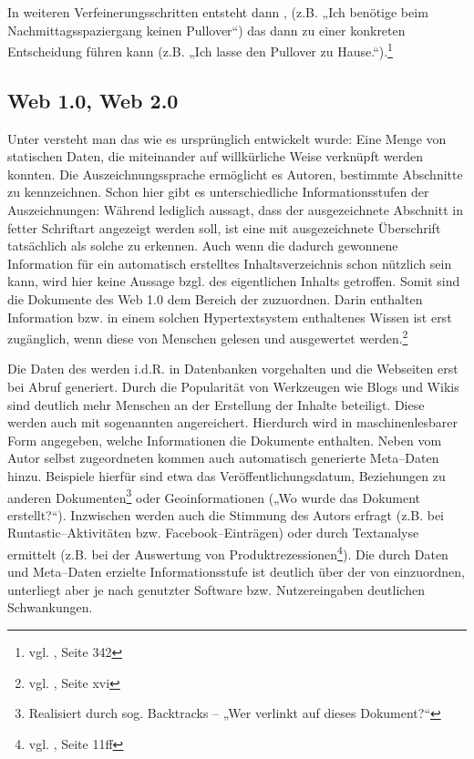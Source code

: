 In weiteren Verfeinerungsschritten entsteht dann , (z.B. „Ich benötige beim Nachmittagsspaziergang keinen Pullover“) das dann zu einer konkreten Entscheidung führen kann (z.B. „Ich lasse den Pullover zu Hause.“).\footnote{vgl. \cite{taylor}, Seite 342}

\subsection{Web 1.0, Web 2.0}

Unter  versteht man das  wie es ursprünglich entwickelt wurde: Eine Menge von statischen Daten, die miteinander auf willkürliche Weise verknüpft werden konnten. Die Auszeichnungssprache  ermöglicht es Autoren, bestimmte Abschnitte zu kennzeichnen. Schon hier gibt es unterschiedliche Informationsstufen der Auszeichnungen: Während  lediglich aussagt, dass der ausgezeichnete Abschnitt in fetter Schriftart angezeigt werden soll, ist eine mit  ausgezeichnete Überschrift tatsächlich als solche zu erkennen. Auch wenn die dadurch gewonnene Information für ein automatisch erstelltes Inhaltsverzeichnis schon nützlich sein kann, wird hier keine Aussage bzgl. des eigentlichen Inhalts getroffen. Somit sind die Dokumente des Web 1.0 dem Bereich der  zuzuordnen. Darin enthalten Information bzw. in einem solchen Hypertextsystem enthaltenes Wissen ist erst zugänglich, wenn diese von Menschen gelesen und ausgewertet werden.\footnote{vgl. \cite{alkhatib}, Seite xvi} 

Die Daten des  werden i.d.R. in Datenbanken vorgehalten und die Webseiten erst bei Abruf generiert. Durch die Popularität von Werkzeugen wie Blogs und Wikis sind deutlich mehr Menschen an der Erstellung der Inhalte beteiligt. Diese werden auch mit sogenannten  angereichert. Hierdurch wird in maschinenlesbarer Form angegeben, welche Informationen die Dokumente enthalten. Neben vom Autor selbst zugeordneten  kommen auch automatisch generierte Meta--Daten hinzu. Beispiele hierfür sind etwa das Veröffentlichungsdatum, Beziehungen zu anderen Dokumenten\footnote{Realisiert durch sog. Backtracks -- „Wer verlinkt auf dieses Dokument?“} oder Geoinformationen („Wo wurde das Dokument erstellt?“). Inzwischen werden auch die Stimmung des Autors erfragt (z.B. bei Runtastic–Aktivitäten bzw. Facebook--Einträgen) oder durch Textanalyse ermittelt (z.B. bei der Auswertung von Produktrezessionen\footnote{vgl. \cite{sprejz}, Seite 11ff}). Die durch Daten und Meta--Daten erzielte Informationsstufe ist deutlich über der von  einzuordnen, unterliegt aber je nach genutzter Software bzw. Nutzereingaben deutlichen Schwankungen.

